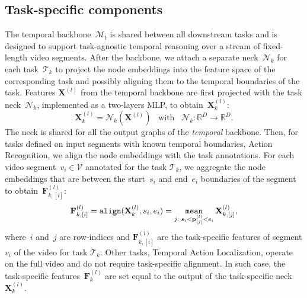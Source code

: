 \subsection{Task-specific components}\label{sec:method_ts}
The temporal backbone~$\mathcal{M}_t$ is shared between all downstream tasks and is designed to support task-agnostic temporal reasoning over a stream of fixed-length video segments.
After the backbone, we attach a separate neck~$\mathcal{N}_k$ for each task~$\mathcal{T}_k$ to project the node embeddings into the feature space of the corresponding task and possibly aligning them to the temporal boundaries of the task.
%
Features $\mathbf{X}^{(l)}$ from the temporal backbone are first projected with the task neck~$\mathcal{N}_k$, implemented as a two-layers MLP, to obtain~$\mathbf{X}^{(l)}_k$:
\begin{equation}\label{eq:task-specific-features}
    \mathbf{X}^{(l)}_k = \mathcal{N}_k \left( \mathbf{X}^{(l)} \right) \;\;\;\text{with}\;\;\;\mathcal{N}_k: \mathbb{R}^D \to \mathbb{R}^D.
\end{equation}
%
The neck is shared for all the output graphs of the \emph{temporal} backbone.
Then, for tasks defined on input segments with known temporal boundaries, \eg Action Recognition, we align the node embeddings with the task annotations.
For each video segment~$v_i \in \mathcal{V}$ annotated for the task $\mathcal{T}_k$, we aggregate the node embeddings that are between the start~$s_i$ and end~$e_i$ boundaries of the segment to obtain~$\mathbf{F}_{k,[i]}^{(l)}$:
\begin{equation}
    \mathbf{F}_{k,[i]}^{(l)} = \mathtt{align} (\mathbf{X}^{(l)}_k, s_i, e_i) = \operatorname*{\mathtt{mean}}_{j: \;s_i<\mathbf{p}^{(l)}_{[j]}<e_i} \mathbf{X}^{(l)}_{k,[j]},
\end{equation}
where~$i$ and~$j$ are row-indices and $\mathbf{F}_{k,[i]}^{(l)}$ are the task-specific features of segment $v_i$ of the video for task $\mathcal{T}_k$.
Other tasks, \eg Temporal Action Localization, operate on the full video and do not require task-specific alignment.
In such case, the task-specific features~$\mathbf{F}_{k}^{(l)}$ are set equal to the output of the task-specific neck $\mathbf{X}^{(l)}_k$.

